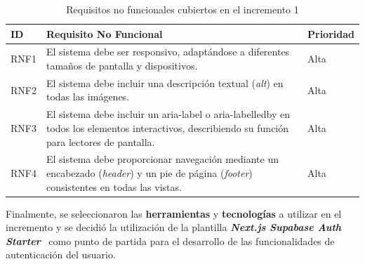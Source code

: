 \begin{table}[H]
    \centering
    \scriptsize
    \begin{tabular}{l p{} l}
    \textbf{ID} & \textbf{Requisito No Funcional} & \textbf{Prioridad} \\ \hline
    RNF1 & El sistema debe ser responsivo, adaptándose a diferentes tamaños de pantalla y dispositivos. & Alta \\ \hline
    RNF2 & El sistema debe incluir una descripción textual (\textit{alt}) en todas las imágenes. & Alta \\ \hline
    RNF3 & El sistema debe incluir un aria-label o aria-labelledby en todos los elementos interactivos, describiendo su función para lectores de pantalla. & Alta \\ \hline
    RNF4 & El sistema debe proporcionar navegación mediante un encabezado (\textit{header}) y un pie de página (\textit{footer}) consistentes en todas las vistas. & Alta \\
    \end{tabular}
    \caption{Requisitos no funcionales cubiertos en el incremento 1}\label{tab:requisitosnofuncionalesincremento1}
\end{table}

Finalmente, se seleccionaron las \textbf{herramientas} y \textbf{tecnologías} a utilizar en el incremento  y se decidió la utilización de la plantilla \textbf{\textit{Next.js Supabase Auth Starter}}~\cite{nextjs_supabase_starter} como punto de partida para el desarrollo de las funcionalidades de autenticación del usuario.